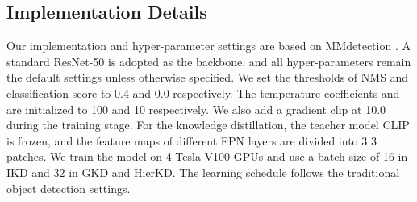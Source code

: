 \documentclass[10pt,twocolumn,letterpaper]{article}
\begin{document}
\subsection{Implementation Details}
Our implementation and hyper-parameter settings are based on MMdetection \cite{chen2019mmdetection}. A standard ResNet-50 \cite{he2016deep} is adopted as the backbone, and all hyper-parameters remain the default settings unless otherwise specified. We set the thresholds of NMS and classification score to 0.4 and 0.0 respectively. The temperature coefficients  and  are initialized to 100 and 10 respectively. We also add a gradient clip at 10.0 during the training stage. For the knowledge distillation, the teacher model CLIP is frozen, and the feature maps of different FPN layers are divided into 3  3 patches. We train the model on 4 Tesla V100 GPUs and use a batch size of 16 in IKD and 32 in GKD and HierKD. The learning schedule follows the traditional object detection settings.



\begin{table}[]
\centering
\footnotesize
{}
\caption{Generalization ability of RPN}
\label{tab:rpn_ge}
\vspace{-0.8em}
\end{table}

\begin{table}[]
\footnotesize
\centering
{}
\caption{Comparisons between different sub-module options in IKD. \textit{pred} and \textit{GT} mean cropping regions from prediction boxes and ground-truth boxes, respectively. 1 and 1.5 represent cropping the original box and its 1.5 center expansion respectively.}
\vspace{-1.6em}
\label{tab:ins-abla}
\end{table}
\end{document}

